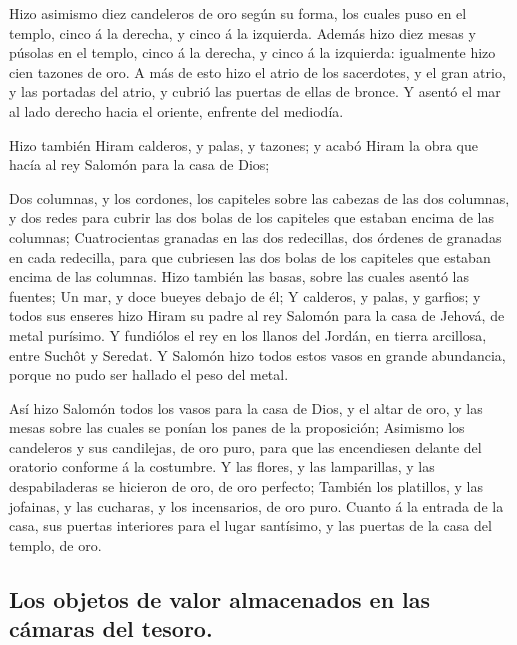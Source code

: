  Hizo asimismo diez candeleros de oro según su forma, los
cuales puso en el templo, cinco á la derecha, y cinco á la izquierda.
 Además hizo diez mesas y púsolas en el templo, cinco á la
derecha, y cinco á la izquierda: igualmente hizo cien tazones de oro.
 A más de esto hizo el atrio de los sacerdotes, y el gran
atrio, y las portadas del atrio, y cubrió las puertas de ellas de
bronce.  Y asentó el mar al lado derecho hacia el
oriente, enfrente del mediodía.

 Hizo también Hiram calderos, y palas, y tazones; y acabó
Hiram la obra que hacía al rey Salomón para la casa de Dios;

 Dos columnas, y los cordones, los capiteles sobre las
cabezas de las dos columnas, y dos redes para cubrir las dos bolas de
los capiteles que estaban encima de las columnas; 
Cuatrocientas granadas en las dos redecillas, dos órdenes de granadas en
cada redecilla, para que cubriesen las dos bolas de los capiteles que
estaban encima de las columnas.  Hizo también las basas,
sobre las cuales asentó las fuentes;  Un mar, y doce
bueyes debajo de él;  Y calderos, y palas, y garfios; y
todos sus enseres hizo Hiram su padre al rey Salomón para la casa de
Jehová, de metal purísimo.  Y fundiólos el rey en los
llanos del Jordán, en tierra arcillosa, entre Suchôt y Seredat.
 Y Salomón hizo todos estos vasos en grande abundancia,
porque no pudo ser hallado el peso del metal.

 Así hizo Salomón todos los vasos para la casa de Dios, y
el altar de oro, y las mesas sobre las cuales se ponían los panes de la
proposición;  Asimismo los candeleros y sus candilejas,
de oro puro, para que las encendiesen delante del oratorio conforme á la
costumbre.  Y las flores, y las lamparillas, y las
despabiladeras se hicieron de oro, de oro perfecto; 
También los platillos, y las jofainas, y las cucharas, y los
incensarios, de oro puro. Cuanto á la entrada de la casa, sus puertas
interiores para el lugar santísimo, y las puertas de la casa del templo,
de oro.

\hypertarget{los-objetos-de-valor-almacenados-en-las-cuxe1maras-del-tesoro.}{%
\subsection{Los objetos de valor almacenados en las cámaras del
tesoro.}\label{los-objetos-de-valor-almacenados-en-las-cuxe1maras-del-tesoro.}}

